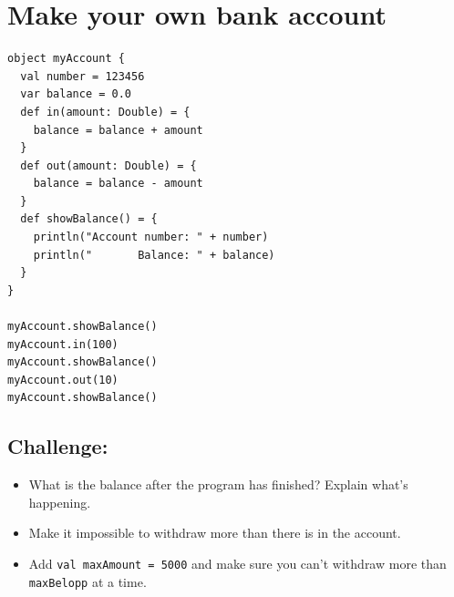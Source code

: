 \chapter{Make your own bank account}
\begin{multicols}{2}

\begin{lstlisting}[basicstyle={\ttfamily\fontsize{16}{19}\selectfont},numbers=none]
object myAccount {
  val number = 123456
  var balance = 0.0
  def in(amount: Double) = {
    balance = balance + amount 
  }
  def out(amount: Double) = { 
    balance = balance - amount 
  }
  def showBalance() = {
    println("Account number: " + number) 
    println("       Balance: " + balance)
  }
}

myAccount.showBalance()
myAccount.in(100)
myAccount.showBalance()
myAccount.out(10)
myAccount.showBalance()
\end{lstlisting}
        


\columnbreak


\section*{\color{BrickRed}Challenge:}


\begin{itemize}

\item {What is the balance after the program has finished? Explain what's happening.}
\item {Make it impossible to withdraw more than there is in the account.}
\item {Add \lstinline{val maxAmount = 5000} and make sure you can't withdraw more than \lstinline{maxBelopp} at a time.}

\end{itemize}


\end{multicols}

